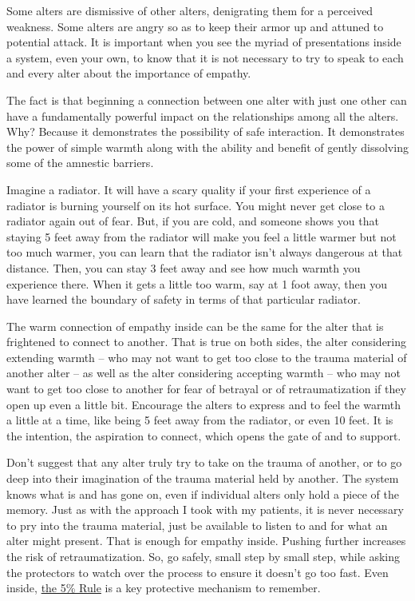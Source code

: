 \documentclass[]{book}
\begin{document}
Some alters are dismissive of other alters, denigrating them for a perceived weakness. Some alters are angry so as to keep their armor up and attuned to potential attack. It is important when you see the myriad of presentations inside a system, even your own, to know that it is not necessary to try to speak to each and every alter about the importance of empathy.

The fact is that beginning a connection between one alter with just one other can have a fundamentally powerful impact on the relationships among all the alters. Why? Because it demonstrates the possibility of safe interaction. It demonstrates the power of simple warmth along with the ability and benefit of gently dissolving some of the amnestic barriers.

Imagine a radiator. It will have a scary quality if your first experience of a radiator is burning yourself on its hot surface. You might never get close to a radiator again out of fear. But, if you are cold, and someone shows you that staying 5 feet away from the radiator will make you feel a little warmer but not too much warmer, you can learn that the radiator isn't always dangerous at that distance. Then, you can stay 3 feet away and see how much warmth you experience there. When it gets a little too warm, say at 1 foot away, then you have learned the boundary of safety in terms of that particular radiator.

The warm connection of empathy inside can be the same for the alter that is frightened to connect to another. That is true on both sides, the alter considering extending warmth -- who may not want to get too close to the trauma material of another alter -- as well as the alter considering accepting warmth -- who may not want to get too close to another for fear of betrayal or of retraumatization if they open up even a little bit. Encourage the alters to express and to feel the warmth a little at a time, like being 5 feet away from the radiator, or even 10 feet. It is the intention, the aspiration to connect, which opens the gate of and to support.

Don't suggest that any alter truly try to take on the trauma of another, or to go deep into their imagination of the trauma material held by another. The system knows what is and has gone on, even if individual alters only hold a piece of the memory. Just as with the approach I took with my patients, it is never necessary to pry into the trauma material, just be available to listen to and for what an alter might present. That is enough for empathy inside.
Pushing further increases the risk of retraumatization. So, go safely, small step by small step, while asking the protectors to watch over the process to ensure it doesn't go too fast. Even inside, \href{https://www.engagingmultiples.com/the-5-rule/}{the 5\% Rule} is a key protective mechanism to remember.
\end{document}

